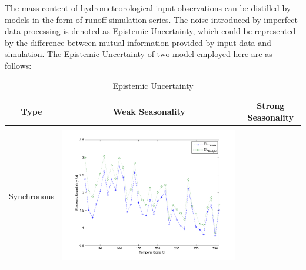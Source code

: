 \documentclass[11pt]{article}
\begin{document}
   
The mass content of hydrometeorological input observations can be distilled by models in the form of runoff simulation series. The noise introduced by imperfect data processing is denoted as Epistemic Uncertainty, which could be represented by the difference between  mutual information provided by input data and  simulation. The Epistemic Uncertainty of two model employed here are as follows:

\begin{table}[H]\small
\caption{Epistemic Uncertainty}
\resizebox{\textwidth}{!}
{
\centering
\begin{tabular}{ccc}
\toprule
Type& Weak Seasonality & Strong Seasonality \\\hline
\\
Synchronous
&\begin{minipage}{.6\textwidth}\includegraphics[width=\linewidth]{resultgraph/05585000EU.png}\end{minipage}


\end{tabular}}
\end{table}
\end{document}
